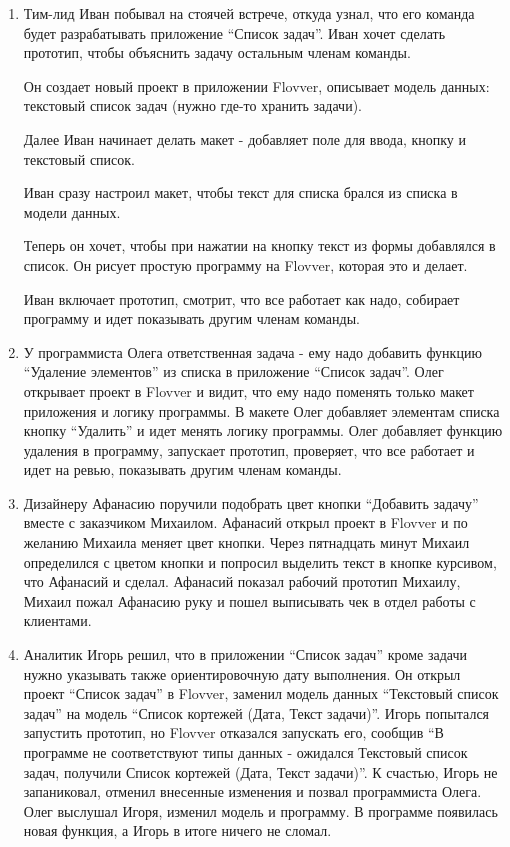 \begin{enumerate}
    \item Тим-лид Иван побывал на стоячей встрече, откуда узнал, что его команда будет разрабатывать приложение “Список задач”. Иван хочет сделать прототип, чтобы объяснить задачу остальным членам команды.

    Он создает новый проект в приложении Flovver, описывает модель данных: текстовый список задач (нужно где-то хранить задачи). 

    Далее Иван начинает делать макет - добавляет поле для ввода, кнопку и текстовый список.

    Иван сразу настроил макет, чтобы текст для списка брался из списка в модели данных.

    Теперь он хочет, чтобы при нажатии на кнопку текст из формы добавлялся в список. Он рисует простую программу на Flovver, которая это и делает.

    Иван включает прототип, смотрит, что все работает как надо, собирает программу и идет показывать другим членам команды.

    \item У программиста Олега ответственная задача - ему надо добавить функцию “Удаление элементов” из списка в приложение “Список задач”. Олег открывает проект в Flovver и видит, что ему надо поменять только макет приложения и логику программы. В макете Олег добавляет элементам списка кнопку “Удалить” и идет менять логику программы. Олег добавляет функцию удаления в программу, запускает прототип, проверяет, что все работает и идет на ревью, показывать другим членам команды.

    \item Дизайнеру Афанасию поручили подобрать цвет кнопки “Добавить задачу” вместе с заказчиком Михаилом. Афанасий открыл проект в Flovver и по желанию Михаила меняет цвет кнопки. Через пятнадцать минут Михаил определился с цветом кнопки и попросил выделить текст в кнопке курсивом, что Афанасий и сделал. Афанасий показал рабочий прототип Михаилу, Михаил пожал Афанасию руку и пошел выписывать чек в отдел работы с клиентами.

    \item Аналитик Игорь решил, что в приложении “Список задач” кроме задачи нужно указывать также ориентировочную дату выполнения. Он открыл проект “Список задач” в Flovver, заменил модель данных “Текстовый список задач” на модель “Список кортежей (Дата, Текст задачи)”. Игорь попытался запустить прототип, но Flovver отказался запускать его, сообщив “В программе не соответствуют типы данных - ожидался Текстовый список задач, получили Список кортежей (Дата, Текст задачи)”. К счастью, Игорь не запаниковал, отменил внесенные изменения и позвал программиста Олега. Олег выслушал Игоря, изменил модель и программу. В программе появилась новая функция, а Игорь в итоге ничего не сломал.
\end{enumerate}


